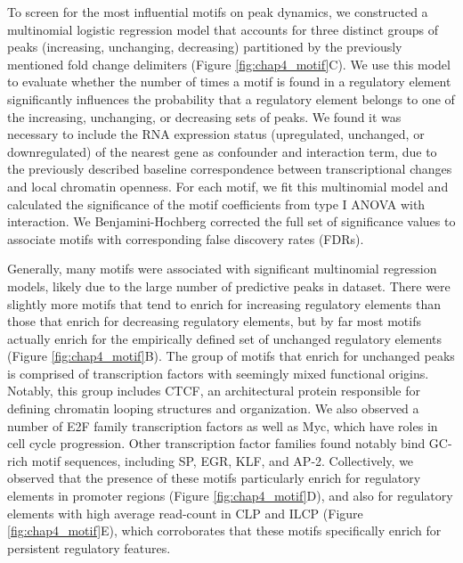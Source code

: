 To screen for the most influential motifs on peak dynamics, we constructed a multinomial logistic regression model that accounts for three distinct groups of peaks (increasing, unchanging, decreasing) partitioned by the previously mentioned fold change delimiters (Figure \ref{fig:chap4_motif}C). We use this model to evaluate whether the number of times a motif is found in a regulatory element significantly influences the probability that a regulatory element belongs to one of the increasing, unchanging, or decreasing sets of peaks. We found it was necessary to include the RNA expression status (upregulated, unchanged, or downregulated) of the nearest gene as confounder and interaction term, due to the previously described baseline correspondence between transcriptional changes and local chromatin openness. For each motif, we fit this multinomial model and calculated the significance of the motif coefficients from type I ANOVA with interaction. We Benjamini-Hochberg corrected the full set of significance values to associate motifs with corresponding false discovery rates (FDRs). 

Generally, many motifs were associated with significant multinomial regression models, likely due to the large number of predictive peaks in dataset. There were slightly more motifs that tend to enrich for increasing regulatory elements than those that enrich for decreasing regulatory elements, but by far most motifs actually enrich for the empirically defined set of unchanged regulatory elements (Figure \ref{fig:chap4_motif}B). The group of motifs that enrich for unchanged peaks is comprised of transcription factors with seemingly mixed functional origins. Notably, this group includes CTCF, an architectural protein responsible for defining chromatin looping structures and organization. We also observed a number of E2F family transcription factors as well as Myc, which have roles in cell cycle progression. Other transcription factor families found notably bind GC-rich motif sequences, including SP, EGR, KLF, and AP-2. Collectively, we observed that the presence of these motifs particularly enrich for regulatory elements in promoter regions (Figure \ref{fig:chap4_motif}D), and also for regulatory elements with high average read-count in CLP and ILCP (Figure \ref{fig:chap4_motif}E), which corroborates that these motifs specifically enrich for persistent regulatory features. 

